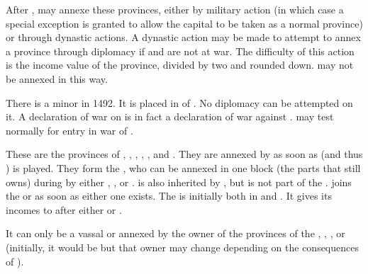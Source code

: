 \aparag[Disappearance] After , \SPA may
annexe these provinces, either by military action (in which case a
special exception is granted to allow the capital to be taken as a
normal province) or through dynastic actions.
\bparag\label{chSpecific:Belgium:Diplomatic Annexation} A dynastic action may
be made to attempt to annex a province through diplomacy if \SPA and
 are not at war. The difficulty of this action is the
income value of the province, divided by two and rounded
down.  may not be annexed in this way.


\label{chSpecific:Burgundy}
 There is a minor
 in 1492. It is placed in \EW of \HAB. No diplomacy can
be attempted on it.
\bparag A declaration of war on  is in fact a
declaration of war against \HAB.
\bparag \HAB may test normally for entry in war of .

 These are the provinces of
, , ,
, ,  and
. They are annexed by \SPA as soon as
 (and thus ) is
played. They form the , who can be annexed
in one block (the parts that \SPA still owns) during 
by either \AUS, \ENG, \FRA or \SPA.
\bparag {} is also inherited by \SPA, but is not
part of the .
\bparag {} joins the  or
 as soon as either one exists.
\bparag The  is initially both in  and
. It gives its incomes to \SPA after either
 or .

\label{chSpecific:Liege}
It can only be a vassal or annexed by the owner of the
provinces of the , \SPA, \AUS, \ENG or \FRA
(initially, it would be \SPA but that owner may change depending on the 
consequences of ).

